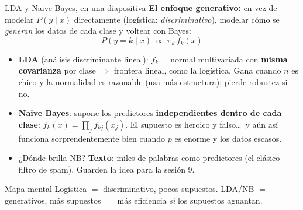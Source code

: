 \documentclass{beamer}
\newcommand{\1}{\mathbb{I}}
\begin{document}
\begin{frame}{LDA y Naive Bayes, en una diapositiva}
\small
\textbf{El enfoque generativo:} en vez de modelar $P(y \mid x)$ directamente (logística: \emph{discriminativo}), modelar cómo se \emph{generan} los datos de cada clase y voltear con Bayes:
\[ P(y = k \mid x) \;\propto\; \pi_k \, f_k(x) \]
\pause

\begin{itemize}\itemsep5pt
  \item \textbf{LDA} (análisis discriminante lineal): $f_k$ = normal multivariada con \textbf{misma covarianza} por clase $\Rightarrow$ frontera lineal, como la logística. Gana cuando $n$ es chico y la normalidad es razonable (usa más estructura); pierde robustez si no. \pause
  \item \textbf{Naive Bayes}: supone los predictores \textbf{independientes dentro de cada clase}: $f_k(x) = \prod_j f_{kj}(x_j)$. El supuesto es heroico y falso\ldots\ y aún así funciona sorprendentemente bien cuando $p$ es enorme y los datos escasos. \pause
  \item ¿Dónde brilla NB? \textbf{Texto}: miles de palabras como predictores (el clásico filtro de spam). Guarden la idea para la sesión 9.
\end{itemize}
\pause

\begin{block}{Mapa mental}
Logística $=$ discriminativo, pocos supuestos. LDA/NB $=$ generativos, más supuestos $=$ más eficiencia \emph{si} los supuestos aguantan.
\end{block}
\end{frame}
\end{document}
